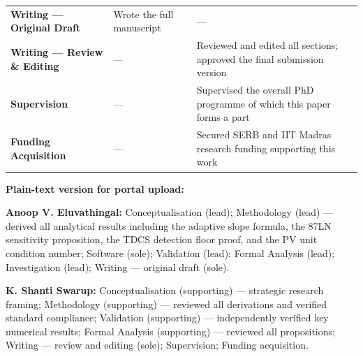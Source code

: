 \documentclass[11pt,a4paper]{article}
\begin{document}
\begin{tabular}{@{} >{\bfseries}p{4.2cm} p{5.0cm} p{5.0cm} @{}}
Writing — Original Draft &
Wrote the full manuscript &
--- \\[6pt]

Writing — Review \& Editing &
--- &
Reviewed and edited all sections; approved the final submission version \\[6pt]

Supervision &
--- &
Supervised the overall PhD programme of which this paper forms a part \\[6pt]

Funding Acquisition &
--- &
Secured SERB and IIT Madras research funding supporting this work \\
\bottomrule
\end{tabular}

\bigskip\bigskip

\noindent\textbf{Plain-text version for portal upload:}

\medskip

\noindent
\textbf{Anoop V. Eluvathingal:} Conceptualisation (lead); Methodology
(lead) --- derived all analytical results including the adaptive slope
formula, the 87LN sensitivity proposition, the TDCS detection floor proof,
and the PV unit condition number; Software (sole); Validation (lead);
Formal Analysis (lead); Investigation (lead); Writing --- original draft
(sole).

\medskip\noindent
\textbf{K. Shanti Swarup:} Conceptualisation (supporting) --- strategic
research framing; Methodology (supporting) --- reviewed all derivations and
verified standard compliance; Validation (supporting) --- independently
verified key numerical results; Formal Analysis (supporting) --- reviewed
all propositions; Writing --- review and editing (sole); Supervision; Funding
acquisition.
\end{document}
